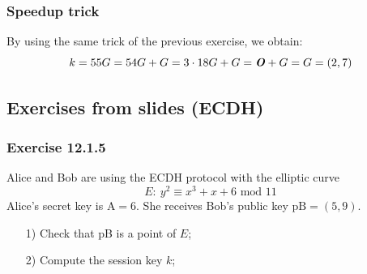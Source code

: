 \documentclass[11pt, a4paper]{article}
\newcommand{\mymod}{
    \text{ mod }
}
\begin{document}
\subsubsection*{Speedup trick}
By using the same trick of the previous exercise, we obtain:
$$k=55G=54G+G=3\cdot18G+G=\text{\textbf{\textit{O}}}+G=G=(2,7)$$

\newpage
\subsection{Exercises from slides (ECDH)}
\subsubsection{Exercise 12.1.5}
Alice and Bob are using the ECDH protocol with the elliptic curve
$$E:\ y^2\equiv x^3+x+6\mymod11$$
Alice's secret key is $\text{A}=6$. She receives Bob's public key $\text{pB}=(5,9)$.
\begin{itemize}
    \item[1)] Check that pB is a point of $E$;
    \item[2)] Compute the session key $k$;
\end{itemize}
\end{document}

